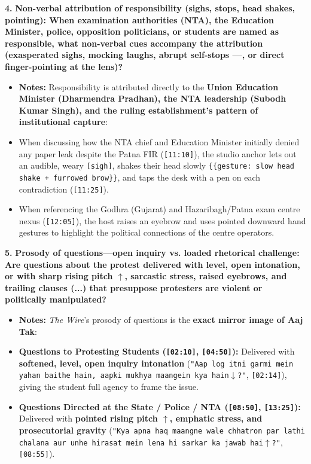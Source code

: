 \documentclass[10pt,a4paper]{article}
\begin{document}
\noindent\textbf{4.} \textbf{Non-verbal attribution of responsibility (sighs, stops, head shakes, pointing): When examination authorities (NTA), the Education Minister, police, opposition politicians, or students are named as responsible, what non-verbal cues accompany the attribution (exasperated sighs, mocking laughs, abrupt self-stops ---, or direct finger-pointing at the lens)?}\par\smallskip
\begin{itemize}
  \item \textbf{Notes:}
Responsibility is attributed directly to the \textbf{Union Education Minister (Dharmendra Pradhan), the NTA leadership (Subodh Kumar Singh), and the ruling establishment's pattern of institutional capture}:\par\smallskip
  \item When discussing how the NTA chief and Education Minister initially denied any paper leak despite the Patna FIR (\texttt{[11:10]}), the studio anchor lets out an audible, weary \texttt{[sigh]}, shakes their head slowly \texttt{\{\{gesture: slow head shake + furrowed brow\}\}}, and taps the desk with a pen on each contradiction (\texttt{[11:25]}).
  \item When referencing the Godhra (Gujarat) and Hazaribagh/Patna exam centre nexus (\texttt{[12:05]}), the host raises an eyebrow and uses pointed downward hand gestures to highlight the political connections of the centre operators.
\end{itemize}

\noindent\textbf{5.} \textbf{Prosody of questions---open inquiry vs. loaded rhetorical challenge: Are questions about the protest delivered with level, open intonation, or with sharp rising pitch $\uparrow$, sarcastic stress, raised eyebrows, and trailing clauses (...) that presuppose protesters are violent or politically manipulated?}\par\smallskip
\begin{itemize}
  \item \textbf{Notes:}
\textit{The Wire}'s prosody of questions is the \textbf{exact mirror image of Aaj Tak}:\par\smallskip
  \item \textbf{Questions to Protesting Students (\texttt{[02:10]}, \texttt{[04:50]}):} Delivered with \textbf{softened, level, open inquiry intonation} (\texttt{"Aap log itni garmi mein yahan baithe hain, aapki mukhya maangein kya hain$\downarrow$?"}, \texttt{[02:14]}), giving the student full agency to frame the issue.
  \item \textbf{Questions Directed at the State / Police / NTA (\texttt{[08:50]}, \texttt{[13:25]}):} Delivered with \textbf{pointed rising pitch \texttt{$\uparrow$}, emphatic stress, and prosecutorial gravity} (\texttt{"Kya apna haq maangne wale chhatron par lathi chalana aur unhe hirasat mein lena hi sarkar ka jawab hai$\uparrow$?"}, \texttt{[08:55]}).
\end{itemize}
\end{document}
